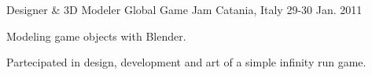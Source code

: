 


\begin{cventries}


\cventry
{Designer \& 3D Modeler} %
{Global Game Jam} %
{Catania, Italy} %
{29-30 Jan. 2011} %
{ %
	\begin{cvitems}
		\item {Modeling game objects with Blender.}
		\item {Partecipated in design, development and art of a simple infinity run game.}
	\end{cvitems}
}


\end{cventries}